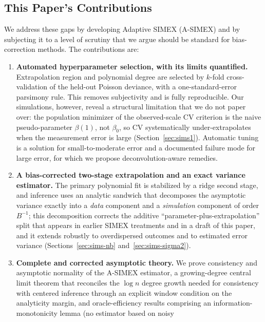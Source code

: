 \subsection{This Paper's Contributions}\label{sec:contrib}

We address these gaps by developing Adaptive SIMEX (A-SIMEX) and by
subjecting it to a level of scrutiny that we argue should be standard
for bias-correction methods. The contributions are:

\begin{enumerate}\itemsep3pt
\item \textbf{Automated hyperparameter selection, with its limits
      quantified.} Extrapolation region and polynomial degree are
      selected by $k$-fold cross-validation of the held-out Poisson
      deviance, with a one-standard-error parsimony rule. This removes
      subjectivity and is fully reproducible. Our simulations,
      however, reveal a structural limitation that we do not paper
      over: the population minimizer of the observed-scale CV criterion
      is the naive pseudo-parameter $\beta(1)$, not $\beta_0$, so CV
      systematically under-extrapolates when the measurement error is
      large (Section~\ref{sec:sims1}). Automatic tuning is a solution
      for small-to-moderate error and a documented failure mode for
      large error, for which we propose deconvolution-aware remedies.
\item \textbf{A bias-corrected two-stage extrapolation and an exact
      variance estimator.} The primary polynomial fit is stabilized by
      a ridge second stage, and inference uses an analytic sandwich
      that decomposes the asymptotic variance exactly into a
      \emph{data} component and a \emph{simulation} component of order
      $B^{-1}$; this decomposition corrects the additive
      ``parameter-plus-extrapolation'' split that appears in earlier
      SIMEX treatments and in a draft of this paper, and it extends
      robustly to overdispersed outcomes and to estimated error
      variance (Sections~\ref{sec:sims-nb} and~\ref{sec:sims-sigma2}).
\item \textbf{Complete and corrected asymptotic theory.} We prove
      consistency and asymptotic normality of the A-SIMEX estimator,
      a growing-degree central limit theorem that reconciles the
      $\log n$ degree growth needed for consistency with centered
      inference through an explicit window condition on the analyticity
      margin, and oracle-efficiency results comprising an
      information-monotonicity lemma (no estimator based on noisy

\end{enumerate}
